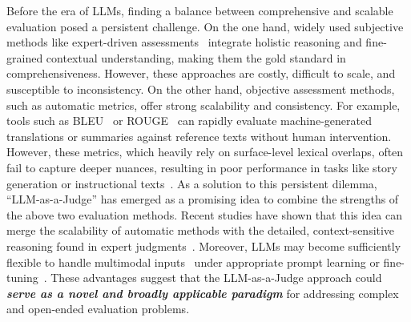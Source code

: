 
Before the era of LLMs, finding a balance between comprehensive and scalable evaluation posed a persistent challenge. On the one hand, widely used subjective methods like expert-driven assessments~\cite {shi2024judging,human_like_summarization} integrate holistic reasoning and fine-grained contextual understanding, making them the gold standard in comprehensiveness. However, these approaches are costly, difficult to scale, and susceptible to inconsistency.
On the other hand, objective assessment methods, such as automatic metrics, offer strong scalability and consistency. For example, tools such as BLEU~\cite{papineni2002bleu} or ROUGE~\cite{lin2004rouge} can rapidly evaluate machine-generated translations or summaries against reference texts without human intervention. However, these metrics, which heavily rely on surface-level lexical overlaps, often fail to capture deeper nuances, resulting in poor performance in tasks like story generation or instructional texts~\cite{schluter-2017-limits}.
As a solution to this persistent dilemma, ``LLM-as-a-Judge'' has emerged as a promising idea to combine the strengths of the above two evaluation methods. Recent studies have shown that this idea can merge the scalability of automatic methods with the detailed, context-sensitive reasoning found in expert judgments~\cite{nips_llm_as_a_judge,wang2023pandalm,zhu2023judgelm,auto-j,data-juicer}.
Moreover, LLMs may become sufficiently flexible to handle multimodal inputs~\cite{mllm-as-a-judge} under appropriate prompt learning or fine-tuning~\cite{khattak2023maple}.
These advantages suggest that the LLM-as-a-Judge approach could \textbf{\textit{serve as a novel and broadly applicable paradigm}} for addressing complex and open-ended evaluation problems.


